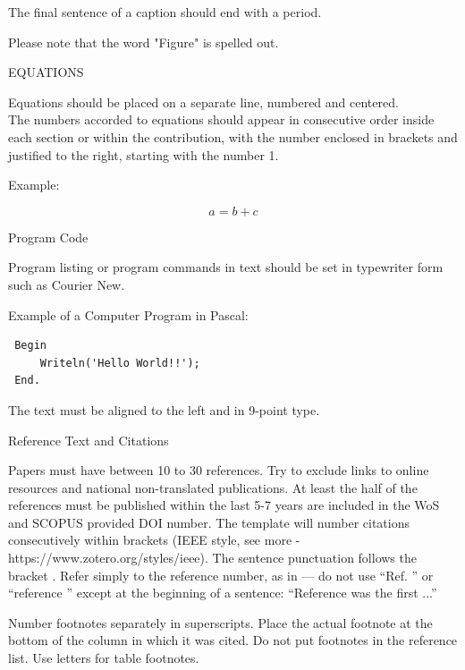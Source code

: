 \documentclass[a4paper,twoside]{article}
\begin{document}
The final sentence of a caption should end with a period.



Please note that the word "Figure" is spelled out.

EQUATIONS

Equations should be placed on a separate line, numbered and
centered.\\The numbers accorded to equations should appear in
consecutive order inside each section or within the contribution,
with the number enclosed in brackets and justified to the right,
starting with the number 1.

Example:

\begin{equation}\label{eq1}
    a=b+c
\end{equation}

Program Code

Program listing or program commands in text should be set in
typewriter form such as Courier New.

Example of a Computer Program in Pascal:

\begin{small}
\begin{verbatim}
 Begin
     Writeln('Hello World!!');
 End.
\end{verbatim}
\end{small}


The text must be aligned to the left and in 9-point type.

Reference Text and Citations

Papers must have between 10 to 30 references. Try to exclude links to online resources and national non-translated publications. At least the half of the references must be published within the last 5-7 years are included in the WoS and SCOPUS provided DOI number. The template will number citations consecutively within brackets \cite{eason1955certain} (IEEE style, see more - https://www.zotero.org/styles/ieee). The sentence punctuation follows the bracket \cite{maxwell1873treatise}. Refer simply to the reference number, as in \cite{maxwell1873treatise} --- do not use “Ref. \cite{maxwell1873treatise}” or “reference \cite{maxwell1873treatise}” except at the beginning of a sentence: “Reference \cite{maxwell1873treatise} was the first ...”


Number footnotes separately in superscripts. Place the actual footnote at the bottom of the column in which it was cited. Do not put footnotes in the reference list. Use letters for table footnotes.
\end{document}
